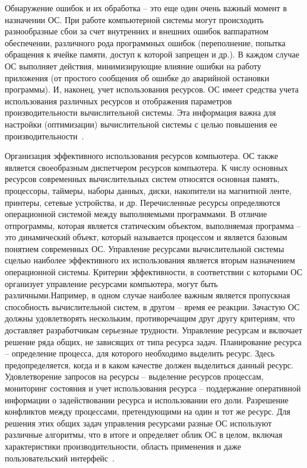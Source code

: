 Обнаружение ошибок и их обработка -- это еще один очень важный момент   в   назначении   ОС.   При   работе   компьютерной   системы   могут происходить разнообразные сбои за счет внутренних и внешних ошибок ваппаратном   обеспечении,   различного   рода   программных   ошибок (переполнение,   попытка   обращения   к   ячейке   памяти,   доступ   к   которой запрещен и др.). В каждом случае ОС выполняет действия, минимизирующие влияние ошибки на работу приложения (от простого сообщения об ошибке до аварийной остановки программы). И, наконец, учет использования ресурсов. ОС  имеет средства учета использования   различных   ресурсов   и   отображения   параметров производительности  вычислительной системы. Эта информация важна для настройки (оптимизации) вычислительной системы с целью повышения ее производительности~\cite{Oc1}.

Организация   эффективного   использования   ресурсов   компьютера.   ОС также является своеобразным диспетчером ресурсов компьютера. К числу основных ресурсов современных вычислительных систем относятся основная память, процессоры,   таймеры, наборы данных, диски, накопители на магнитной ленте, принтеры, сетевые устройства, и др. Перечисленные ресурсы определяются операционной системой между выполняемыми программами. В отличие отпрограммы, которая является статическим объектом, выполняемая программа – это динамический объект, который называется процессом и является базовым понятием современных ОС. Управление ресурсами вычислительной системы сцелью наиболее эффективного их использования является вторым назначением операционной системы. Критерии эффективности, в соответствии с которыми ОС организует управление ресурсами компьютера, могут быть различными.Например, в одном случае наиболее важным является пропускная способность вычислительной систем, в другом – время ее реакции. Зачастую ОС должны удовлетворять   нескольким,   противоречащим   друг   другу   критериям,   что доставляет   разработчикам   серьезные   трудности.   Управление   ресурсам и включает решение ряда общих, не зависящих от типа ресурса задач. Планирование ресурса – определение процесса, для которого необходимо выделить ресурс. Здесь предопределяется, когда и в каком качестве должен выделиться данный ресурс. Удовлетворение запросов на ресурсы – выделение ресурсов процессам, мониторинг состояния и учет использования ресурса – поддержание   оперативной   информации   о   задействовании   ресурса   и использовании   его   доли.   Разрешение   конфликтов   между   процессами, претендующими на один и тот же ресурс. Для   решения   этих   общих   задач   управления   ресурсами   разные   ОС используют различные алгоритмы, что в итоге и определяет облик ОС в целом, включая   характеристики   производительности,  область   применения   и   даже пользовательский интерфейс~\cite{Oc1}.

